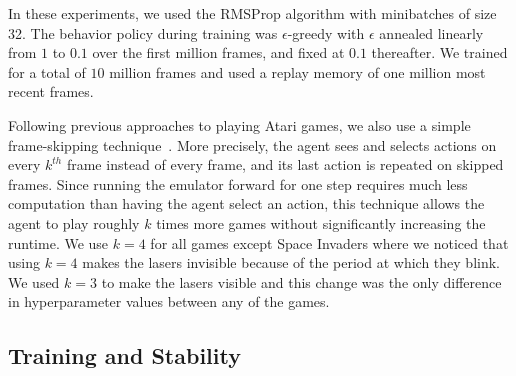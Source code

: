 \documentclass{article} %
\begin{document}
In these experiments, we used the RMSProp algorithm with minibatches of size 32.  The behavior policy during training was $\epsilon$-greedy with $\epsilon$ annealed linearly from $1$ to $0.1$ over the first million frames, and fixed at $0.1$ thereafter.  We trained for a total of $10$ million frames and used a replay memory of one million most recent frames.

Following previous approaches to playing Atari games, we also use a simple frame-skipping technique~\cite{bellemare-ale}. More precisely, the agent sees and selects actions on every $k^{th}$ frame instead of every frame, and its last action is repeated on skipped frames.  Since running the emulator forward for one step requires much less computation than having the agent select an action, this technique allows the agent to play roughly $k$ times more games without significantly increasing the runtime.  We use $k=4$ for all games except Space Invaders where we noticed that using $k=4$ makes the lasers invisible because of the period at which they blink.  We used $k=3$ to make the lasers visible and this change was the only difference in hyperparameter values between any of the games.

\subsection{Training and Stability}
\end{document}
